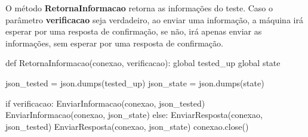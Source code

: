 O método \textbf{RetornaInformacao} retorna as informações do teste. Caso o parâmetro \textbf{verificacao} seja verdadeiro, ao enviar uma informação, a máquina irá esperar por uma resposta 
de confirmação, se não, irá apenas enviar as informações, sem esperar por uma resposta de confirmação.

\vspace*{1cm}
\begin{python}
def RetornaInformacao(conexao, verificacao):
    global tested_up
    global state

    json_tested = json.dumps(tested_up)
    json_state = json.dumps(state)

    if verificacao:
        EnviarInformacao(conexao, json_tested)
        EnviarInformacao(conexao, json_state)
    else:
        EnviarResposta(conexao, json_tested)
        EnviarResposta(conexao, json_state)
    conexao.close()
\end{python}